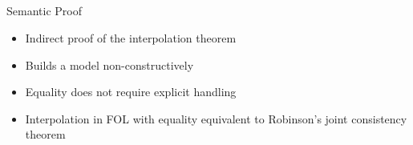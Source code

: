 \documentclass[final,compress]{beamer}
\begin{document}
\subsection{}
\begin{frame}{Semantic Proof}
	\begin{itemize}
		\item Indirect proof of the interpolation theorem

		\item Builds a model non-constructively 

		\item Equality does not require explicit handling

		\item Interpolation in FOL with equality equivalent to Robinson's joint consistency theorem

	\end{itemize}




\end{frame}
\end{document}
